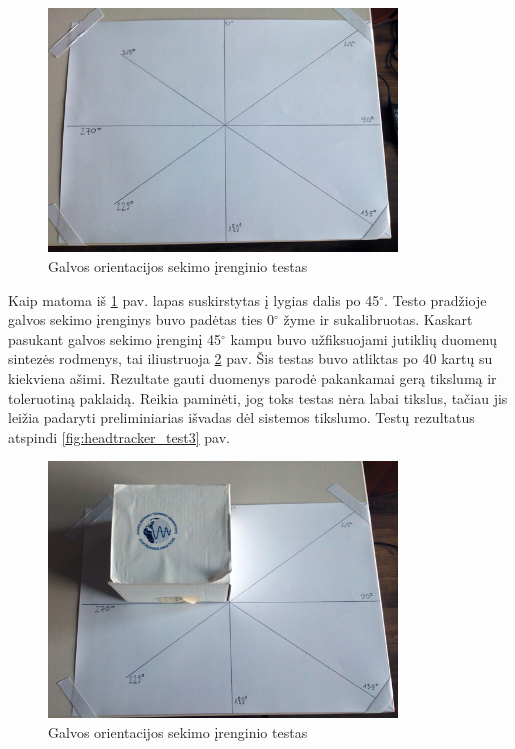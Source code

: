 \documentclass[]{vgtuef}
\begin{document}
{\begin{figure}[htbp]
  \centering
  \includegraphics[width=350px]{img/head_tracker_testu_stalas.png}
  \caption{Galvos orientacijos sekimo įrenginio testas}
  \label{fig:headtracker_test1}
\end{figure}

Kaip matoma iš \ref{fig:headtracker_test1} pav. lapas suskirstytas į lygias dalis po 45$^\circ$. Testo pradžioje galvos sekimo įrenginys buvo padėtas ties 0$^\circ$ žyme ir sukalibruotas. Kaskart pasukant galvos sekimo įrenginį 45$^\circ$ kampu buvo užfiksuojami jutiklių duomenų sintezės rodmenys, tai iliustruoja \ref{fig:headtracker_test2} pav. Šis testas buvo atliktas po 40 kartų su kiekviena ašimi. Rezultate gauti duomenys parodė pakankamai gerą tikslumą ir toleruotiną paklaidą. Reikia paminėti, jog toks testas nėra labai tikslus, tačiau jis leižia padaryti preliminiarias išvadas dėl sistemos tikslumo. Testų rezultatus atspindi \ref{fig:headtracker_test3} pav. 

\begin{figure}[htbp]
  \centering
  \includegraphics[width=350px]{img/head_tracker_testas.png}
  \caption{Galvos orientacijos sekimo įrenginio testas}
  \label{fig:headtracker_test2}
\end{figure}

}
\end{document}
